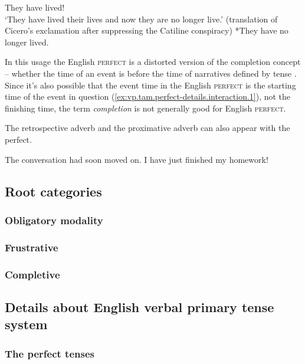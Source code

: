 \documentclass[UTF8, a4paper, oneside, scheme=plain, 12pt]{ctexbook}
\newcommand*{\citesec}[1]{\S~{#1}}
\newcommand*{\term}[1]{\emph{#1}}
\newcommand{\category}[1]{\textsc{#1}}
\newcommand{\translate}[1]{`#1'}
\begin{document}
\begin{exe}
    \ex\label{ex:vp.tam.perfect-details.interaction.3} They have lived! \\
    \translate{They have lived their lives and now they are no longer live.} 
    (translation of Cicero's exclamation after suppressing the Catiline conspiracy)
    \ex\label{ex:vp.tam.perfect-details.interaction.4} *They have no longer lived.
\end{exe}
In this usage the English \category{perfect}
is a distorted version of the completion concept 
-- whether the time of an event is before the time of narratives defined by tense 
\citep[\citesec{19.7}]{dixon2012basic3}.
Since it's also possible that the event time in the English \category{perfect} 
is the starting time of the event in question
(\ref{ex:vp.tam.perfect-details.interaction.1}),
not the finishing time,
the term \term{completion} is not generally good for English \category{perfect}.

The retrospective adverb and the proximative adverb can also appear with the perfect.

\begin{exe}
    \ex The conversation had soon moved on. 
    \ex I have just finished my homework!
\end{exe}

\subsection{Root categories}

\subsubsection{Obligatory modality}

\subsubsection{Frustrative}

\subsubsection{Completive}

\subsection{Details about English verbal primary tense system}\label{sec:tam.verbal-tense}

\subsubsection{The perfect tenses}
\end{document}
